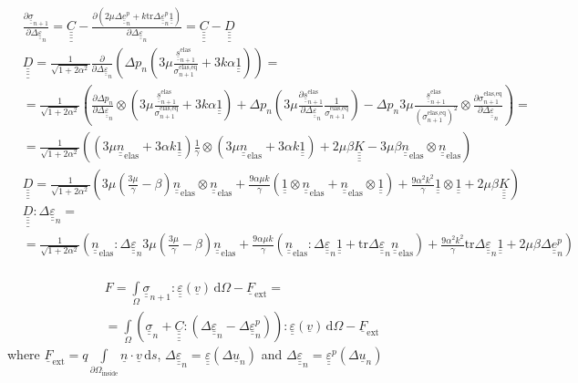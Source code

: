 \documentclass[12pt]{article}
\newcommand\ul[1]{\underline{#1}}
\newcommand\uusigma{\ul{\ul{\sigma}}}
\newcommand\uv{\ul{v}}
\newcommand\uF{\ul{F}}
\newcommand\uu{\ul{u}}
\newcommand\un{\ul{n}}
\newcommand\uus{\ul{\ul{s}}}
\newcommand\uue{\ul{\ul{e}}}
\newcommand\uuUnit{\ul{\ul{1}}}
\newcommand\uueps{\ul{\ul{\varepsilon}}}
\newcommand{\uuuuK}{\ul{\ul{\ul{\ul{K}}}}}
\newcommand{\uuuuC}{\ul{\ul{\ul{\ul{C}}}}}
\newcommand{\uuuuD}{\ul{\ul{\ul{\ul{D}}}}}
\newcommand\Deltaepsp{\Delta \uueps_{n}^p}
\newcommand\Deltaeps{\Delta \uueps_{n}}
\newcommand\Deltaep{\Delta \uue_{n}^p}
\newcommand\sigmaeqnelas{\sigma_{n+1}^\text{elas,eq}}
\newcommand\uusnelas{\uus_{n+1}^\text{elas}}
\newcommand\uusigman{\ul{\ul{\sigma}}_{n+1}}
\newcommand{\uunelas}{\ul{\ul{n}}_\text{elas}}
\newcommand\mtr{\mathrm{tr}}
\newcommand\md{\mathrm{d}}
\begin{document}
\begin{align}
    & \frac{\partial\uusigman}{\partial \Deltaeps} = \uuuuC - \frac{\partial (2\mu\Deltaep + k\mtr\Deltaepsp\uuUnit)}{\partial\Deltaeps} = \uuuuC - \uuuuD \\
    & \uuuuD = \frac{1}{\sqrt{1 + 2\alpha^2}} \frac{\partial }{\partial \Deltaeps} \left( \Delta p_n \left( 3\mu \frac{\uusnelas}{\sigmaeqnelas} + 3k\alpha \uuUnit  \right) \right) = \\
    & = \frac{1}{\sqrt{1 + 2\alpha^2}}\left( \frac{\partial\Delta p_n}{\partial\Deltaeps} \otimes \left( 3\mu\frac{\uusnelas}{\sigmaeqnelas} + 3k\alpha \uuUnit \right) + \Delta p_n \left(3\mu\frac{\partial\uusnelas}{\partial\Deltaeps}\frac{1}{\sigmaeqnelas} \right) - \Delta p_n 3\mu\frac{\uusnelas}{(\sigmaeqnelas)^2} \otimes \frac{\partial\sigmaeqnelas}{\partial\Deltaeps}\right) = \\
    & = \frac{1}{\sqrt{1 + 2\alpha^2}}\left( \left( 3\mu \uunelas + 3\alpha k \uuUnit \right) \frac{1}{\gamma} \otimes \left( 3\mu \uunelas + 3\alpha k \uuUnit \right) + 2\mu\beta\uuuuK - 3\mu\beta\uunelas \otimes \uunelas \right) \\
    & \uuuuD = \frac{1}{\sqrt{1 + 2\alpha^2}}\left( 3\mu\left(\frac{3\mu}{\gamma} - \beta\right)\uunelas \otimes \uunelas + \frac{9\alpha\mu k}{\gamma} (\uuUnit \otimes \uunelas + \uunelas \otimes \uuUnit) + \frac{9\alpha^2k^2}{\gamma} \uuUnit \otimes \uuUnit + 2\mu\beta \uuuuK \right) \\
    & \uuuuD : \Deltaeps = \\
    & = \frac{1}{\sqrt{1 + 2\alpha^2}}\left( \uunelas : \Deltaeps 3\mu \left( \frac{3\mu}{\gamma} - \beta \right) \uunelas + \frac{9\alpha\mu k}{\gamma} (\uunelas : \Deltaeps \uuUnit + \mtr\Deltaeps \uunelas) + \frac{9\alpha^2k^2}{\gamma} \mtr \Deltaeps \uuUnit + 2\mu\beta \Deltaep \right)  \\
\end{align}

\begin{align}
    & F = \int\limits_\Omega \uusigman : \uueps(\uv) \, \md\Omega - \uF_\text{ext} = \\ 
    & = \int\limits_\Omega \left( \uusigma_n + \uuuuC : (\Deltaeps - \Deltaeps^p) \right) : \uueps(\uv) \, \md\Omega - \uF_\text{ext} 
\end{align}
where $\uF_\text{ext} = q \int\limits_{\partial\Omega_\text{inside}}\un \cdot \uv \, \md s $, $\Deltaeps = \uueps(\Delta\uu_n)$ and $\Deltaeps = \uueps^p(\Delta\uu_n)$
\end{document}
